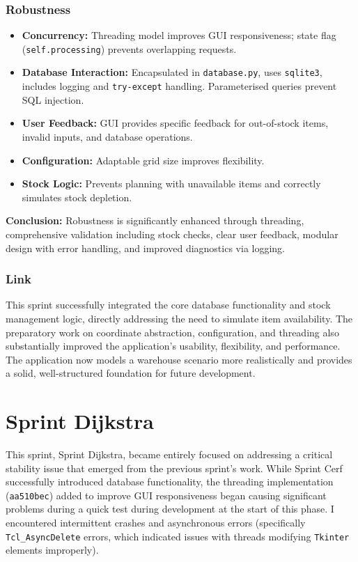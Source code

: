\subsubsection{Robustness}
	\begin{itemize}
		\item \textbf{Concurrency:} Threading model improves GUI responsiveness; state flag (\verb|self.processing|) prevents overlapping requests.
		\item \textbf{Database Interaction:} Encapsulated in \verb|database.py|, uses \verb|sqlite3|, includes logging and \verb|try-except| handling. Parameterised queries prevent SQL injection.
		\item \textbf{User Feedback:} GUI provides specific feedback for out-of-stock items, invalid inputs, and database operations.
		\item \textbf{Configuration:} Adaptable grid size improves flexibility.
		\item \textbf{Stock Logic:} Prevents planning with unavailable items and correctly simulates stock depletion.
	\end{itemize}
	\textbf{Conclusion:} Robustness is significantly enhanced through threading, comprehensive validation including stock checks, clear user feedback, modular design with error handling, and improved diagnostics via logging.
		
\subsubsection{Link}
This sprint successfully integrated the core database functionality and stock management logic, directly addressing the need to simulate item availability. The preparatory work on coordinate abstraction, configuration, and threading also substantially improved the application's usability, flexibility, and performance. The application now models a warehouse scenario more realistically and provides a solid, well-structured foundation for future development.

\newpage

\section{Sprint Dijkstra}

This sprint, Sprint Dijkstra, became entirely focused on addressing a critical stability issue that emerged from the previous sprint's work. While Sprint Cerf successfully introduced database functionality, the threading implementation (\verb|aa510bec|) added to improve GUI responsiveness began causing significant problems during a quick test during development at the start of this phase. I encountered intermittent crashes and asynchronous errors (specifically \verb|Tcl_AsyncDelete| errors, which indicated issues with threads modifying \verb|Tkinter| elements improperly).

